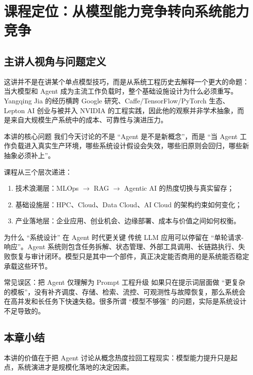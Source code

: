 \section{课程定位：从模型能力竞争转向系统能力竞争}

\subsection{主讲人视角与问题定义}
这讲并不是在讲某个单点模型技巧，而是从系统工程历史去解释一个更大的命题：当大模型和 Agent 成为主流工作负载时，整个基础设施设计为什么必须重写。Yangqing Jia 的经历横跨 Google 研究、Caffe/TensorFlow/PyTorch 生态、Lepton AI 创业与被并入 NVIDIA 的工程实践，因此他的观察并非学术抽象，而是来自大规模生产系统中的成本、可靠性与演进压力。

\begin{importantbox}{本讲的核心问题}
我们今天讨论的不是 ``Agent 是不是新概念''，而是 ``当 Agent 工作负载进入真实生产环境，哪些系统设计假设会失效，哪些旧原则会回归，哪些新抽象必须补上''。
\end{importantbox}

课程从三个层次递进：
\begin{enumerate}
    \item 技术浪潮层：MLOps $\rightarrow$ RAG $\rightarrow$ Agentic AI 的热度切换与真实留存；
    \item 基础设施层：HPC、Cloud、Data Cloud、AI Cloud 的架构约束如何变化；
    \item 产业落地层：企业应用、创业机会、边缘部署、成本与价值之间如何权衡。
\end{enumerate}

\begin{knowledgebox}{为什么 ``系统设计'' 在 Agent 时代更关键}
传统 LLM 应用可以停留在 ``单轮请求-响应''。Agent 系统则包含任务拆解、状态管理、外部工具调用、长链路执行、失败恢复与审计闭环。模型只是其中一个部件，真正决定能否商用的是系统能否稳定承载这些环节。
\end{knowledgebox}

\begin{warningbox}{常见误区：把 Agent 仅理解为 Prompt 工程升级}
如果只在提示词层面做 ``更复杂的模板''，没有补齐调度、存储、检索、流控、可观测性与故障恢复，那么系统会在高并发和长任务下快速失稳。很多所谓 ``模型不够强'' 的问题，实际是系统设计不足导致的。
\end{warningbox}

\subsection{本章小结}
本讲的价值在于把 Agent 讨论从概念热度拉回工程现实：模型能力提升只是起点，系统演进才是规模化落地的决定因素。

